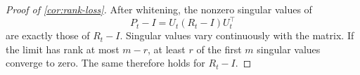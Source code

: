 \begin{proof}[Proof of \cref{cor:rank-loss}]
After whitening, the nonzero singular values of
\[
  P_t-I=U_t(R_t-I)U_t^\top
\]
are exactly those of \(R_t-I\).  Singular values vary continuously with the
matrix.  If the limit has rank at most \(m-r\), at least \(r\) of the first
\(m\) singular values converge to zero.  The same therefore holds for
\(R_t-I\).
\end{proof}

